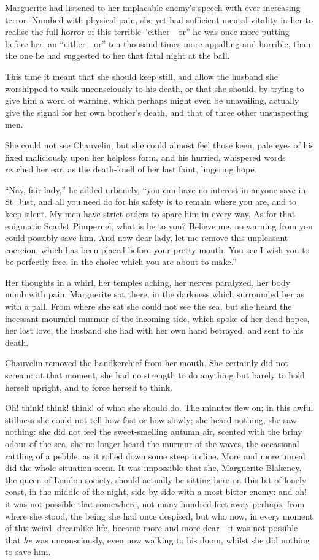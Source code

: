 Marguerite had listened to her implacable enemy's speech with ever-increasing terror. Numbed with physical pain, she yet had sufficient mental vitality in her to realise the full horror of this terrible \enquote{either---or} he was once more putting before her; an \enquote{either---or} ten thousand times more appalling and horrible, than the one he had suggested to her that fatal night at the ball.

This time it meant that she should keep still, and allow the husband she worshipped to walk unconsciously to his death, or that she should, by trying to give him a word of warning, which perhaps might even be unavailing, actually give the signal for her own brother's death, and that of three other unsuspecting men.

She could not see Chauvelin, but she could almost feel those keen, pale eyes of his fixed maliciously upon her helpless form, and his hurried, whispered words reached her ear, as the death-knell of her last faint, lingering hope.

\enquote{Nay, fair lady,} he added urbanely, \enquote{you can have no interest in anyone save in St~Just, and all you need do for his safety is to remain where you are, and to keep silent. My men have strict orders to spare him in every way. As for that enigmatic Scarlet Pimpernel, what is he to you? Believe me, no warning from you could possibly save him. And now dear lady, let me remove this unpleasant coercion, which has been placed before your pretty mouth. You see I wish you to be perfectly free, in the choice which you are about to make.}

Her thoughts in a whirl, her temples aching, her nerves paralyzed, her body numb with pain, Marguerite sat there, in the darkness which surrounded her as with a pall. From where she sat she could not see the sea, but she heard the incessant mournful murmur of the incoming tide, which spoke of her dead hopes, her lost love, the husband she had with her own hand betrayed, and sent to his death.

Chauvelin removed the handkerchief from her mouth. She certainly did not scream: at that moment, she had no strength to do anything but barely to hold herself upright, and to force herself to think.

Oh! think! think! think! of what she should do. The minutes flew on; in this awful stillness she could not tell how fast or how slowly; she heard nothing, she saw nothing: she did not feel the sweet-smelling autumn air, scented with the briny odour of the sea, she no longer heard the murmur of the waves, the occasional rattling of a pebble, as it rolled down some steep incline. More and more unreal did the whole situation seem. It was impossible that she, Marguerite Blakeney, the queen of London society, should actually be sitting here on this bit of lonely coast, in the middle of the night, side by side with a most bitter enemy: and oh! it was not possible that somewhere, not many hundred feet away perhaps, from where she stood, the being she had once despised, but who now, in every moment of this weird, dreamlike life, became more and more dear---it was not possible that \textit{he} was unconsciously, even now walking to his doom, whilst she did nothing to save him.

